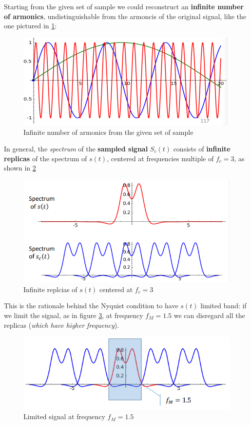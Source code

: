 \documentclass[10pt,a4paper]{report}
\theoremstyle{definition}
\begin{document}
Starting from the given set of sample we could reconstruct an \textbf{infinite number of armonics}, undistinguishable from the armoncis of the original signal, like the one pictured in \ref{infinite-reconstruct}:
\begin{figure}[h!]
	\centering\includegraphics[scale=0.50]{images/Pasted image 20230526115550.png}
	\caption{Infinite number of armonics from the given set of sample}
	\label{infinite-reconstruct}
\end{figure}


In general, the \textit{spectrum} of the \textbf{sampled signal} $S_{c}(t)$ consists of \textbf{infinite replicas} of the spectrum of $s(t)$, centered at frequencies multiple of $f_{c}=3$, as shown in \ref{multiple-freq}
\begin{figure}[h]
	\centering
	\includegraphics[scale=0.50]{images/Pasted image 20230526120142.png}
	\caption{Infinite replcias of $s(t)$ centered at $f_{c}=3$}
	\label{multiple-freq}
\end{figure}

This is the rationale behind the Nyquist condition to have $s(t)$ limited band: if we limit the signal, as in figure \ref{limited-signal}, at frequency $f_{M} = 1.5$ we can disregard all the replicas (\textit{which have higher frequency}).
\begin{figure}[h!]
	\centering\includegraphics[scale=0.50]{images/Pasted image 20230526120124.png}
	\caption{Limited signal at frequency $f_{M} = 1.5$}
	\label{limited-signal}
\end{figure}
\end{document}
